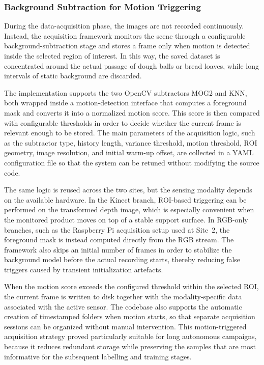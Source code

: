 
\subsubsection{Background Subtraction for Motion Triggering}
During the data-acquisition phase, the images are not recorded continuously. Instead, the acquisition framework monitors the scene through a configurable background-subtraction stage and stores a frame only when motion is detected inside the selected region of interest.\cite{opencv_background_subtraction_2026,labby_kinect_acquisition_2026} In this way, the saved dataset is concentrated around the actual passage of dough balls or bread loaves, while long intervals of static background are discarded.

The implementation supports the two OpenCV subtractors MOG2 and KNN, both wrapped inside a motion-detection interface that computes a foreground mask and converts it into a normalized motion score.\cite{opencv_background_subtraction_2026,labby_kinect_acquisition_2026} This score is then compared with configurable thresholds in order to decide whether the current frame is relevant enough to be stored. The main parameters of the acquisition logic, such as the subtractor type, history length, variance threshold, motion threshold, ROI geometry, image resolution, and initial warm-up offset, are collected in a YAML configuration file so that the system can be retuned without modifying the source code.\cite{labby_kinect_acquisition_2026}

The same logic is reused across the two sites, but the sensing modality depends on the available hardware. In the Kinect branch, ROI-based triggering can be performed on the transformed depth image, which is especially convenient when the monitored product moves on top of a stable support surface. In RGB-only branches, such as the Raspberry Pi acquisition setup used at Site~2, the foreground mask is instead computed directly from the RGB stream.\cite{labby_kinect_acquisition_2026} The framework also skips an initial number of frames in order to stabilize the background model before the actual recording starts, thereby reducing false triggers caused by transient initialization artefacts.

When the motion score exceeds the configured threshold within the selected ROI, the current frame is written to disk together with the modality-specific data associated with the active sensor. The codebase also supports the automatic creation of timestamped folders when motion starts, so that separate acquisition sessions can be organized without manual intervention.\cite{labby_kinect_acquisition_2026} This motion-triggered acquisition strategy proved particularly suitable for long autonomous campaigns, because it reduces redundant storage while preserving the samples that are most informative for the subsequent labelling and training stages.
